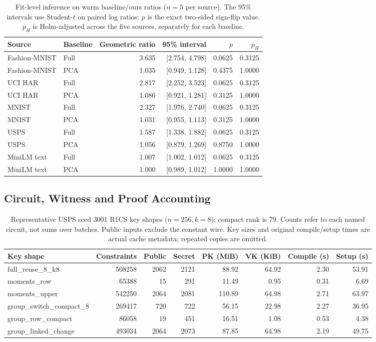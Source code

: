 \documentclass[5p,times,twocolumn]{elsarticle}
\begin{document}
\begin{table}[H]
\centering\small
\caption{Fit-level inference on warm baseline/ours ratios ($n=5$ per source). The 95\% intervals use Student-$t$ on paired log ratios; $p$ is the exact two-sided sign-flip value. $p_H$ is Holm-adjusted across the five sources, separately for each baseline.}
\label{tab:final-stats}
\begin{tabular}{@{}llrrrr@{}}\toprule
Source & Baseline & Geometric ratio & 95\% interval & $p$ & $p_H$\\
\midrule
Fashion-MNIST & Full & 3.635 & [2.754, 4.798] & 0.0625 & 0.3125\\
Fashion-MNIST & PCA & 1.035 & [0.949, 1.128] & 0.4375 & 1.0000\\
UCI HAR & Full & 2.817 & [2.252, 3.523] & 0.0625 & 0.3125\\
UCI HAR & PCA & 1.086 & [0.921, 1.281] & 0.3125 & 1.0000\\
MNIST & Full & 2.327 & [1.976, 2.740] & 0.0625 & 0.3125\\
MNIST & PCA & 1.031 & [0.955, 1.113] & 0.3125 & 1.0000\\
USPS & Full & 1.587 & [1.338, 1.882] & 0.0625 & 0.3125\\
USPS & PCA & 1.056 & [0.879, 1.269] & 0.8750 & 1.0000\\
MiniLM text & Full & 1.007 & [1.002, 1.012] & 0.0625 & 0.3125\\
MiniLM text & PCA & 1.000 & [0.989, 1.012] & 1.0000 & 1.0000\\
\bottomrule
\end{tabular}
\end{table}


\subsection{Circuit, Witness and Proof Accounting}
\begin{table}[H]
\centering\small
\caption{Representative USPS seed 3001 R1CS key shapes ($n=256,k=8$); compact rank is 79. Counts refer to each named circuit, not sums over batches. Public inputs exclude the constant wire. Key sizes and original compile/setup times are actual cache metadata; repeated copies are omitted.}
\label{tab:final-circuits}
\begin{tabular}{@{}lrrrrrrr@{}}\toprule
Key shape & Constraints & Public & Secret & PK (MiB) & VK (KiB) & Compile (s) & Setup (s)\\
\midrule
full\_reuse\_8\_k8 & 508258 & 2062 & 2121 & 88.92 & 64.92 & 2.30 & 53.91\\
moments\_row & 65388 & 15 & 291 & 11.49 & 0.95 & 0.31 & 6.69\\
moments\_upper & 542250 & 2064 & 2081 & 110.89 & 64.98 & 2.71 & 63.97\\
group\_switch\_compact\_8 & 269417 & 720 & 722 & 56.15 & 22.98 & 2.27 & 36.95\\
group\_row\_compact & 86058 & 19 & 451 & 16.51 & 1.08 & 0.53 & 4.38\\
group\_linked\_change & 493034 & 2064 & 2073 & 87.85 & 64.98 & 2.19 & 49.75\\
\bottomrule
\end{tabular}
\end{table}
\end{document}
